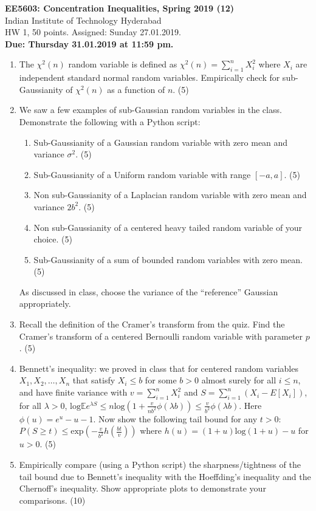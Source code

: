 \documentclass{article}
\begin{document}
\begin{center}
{\large{{\bf{EE5603: Concentration Inequalities, Spring 2019 (12)}\\}}}
Indian Institute of Technology Hyderabad\\
HW 1, 50 points. Assigned: Sunday 27.01.2019.\\
{\bf{Due: Thursday 31.01.2019 at 11:59 pm.}} 
\end{center}
\begin{enumerate}
\item{The $\chi^2(n)$ random variable is defined as $\chi^2(n) = \sum\limits_{i=1}^{n}X_i^2$ where $X_i$ are independent standard normal random variables. Empirically check for sub-Gaussianity of $\chi^2(n)$ as a function of $n$. (5)}
\item{We saw a few examples of sub-Gaussian random variables in the class. Demonstrate the following with a Python script:
\begin{enumerate}
\item{Sub-Gaussianity of a Gaussian random variable with zero mean and variance $\sigma^2$. (5)}
\item{Sub-Gaussianity of a Uniform random variable with range $[-a, a]$. (5)}
\item{Non sub-Gaussianity of a Laplacian random variable with zero mean and variance $2b^2$. (5)}
\item{Non sub-Gaussianity of a centered heavy tailed random variable of your choice. (5)}
\item{Sub-Gaussianity of a sum of bounded random variables with zero mean. (5)}
\end{enumerate}
As discussed in class, choose the variance of the ``reference'' Gaussian appropriately. 
}
\item{Recall the definition of the Cramer's transform from the quiz. Find the Cramer's transform of a centered Bernoulli random variable with parameter $p$. (5)}
\item{Bennett's inequality: we proved in class that for centered random variables $X_1, X_2, \ldots, X_n$ that satisfy $X_i \leq b$ for some $b > 0$ almost surely for all $i \leq n$, and have finite variance with $v = \sum\limits_{i=1}^nX_i^2$ and $S = \sum\limits_{i=1}^n (X_i - E[X_i])$, for all $\lambda > 0$, 
$\text{log} {\mathbb{E}}e^{\lambda S} \leq n\text{log} (1 + \frac{v}{nb^2} \phi(\lambda b)) \leq \frac{v}{b^2}\phi(\lambda b)$. Here $\phi(u) = e^u - u - 1$. Now show the following tail bound for any $t > 0$:
 $P(S \geq t) \leq \text{exp}(-\frac{v}{b^2}h(\frac{bt}{v}))$ where $h(u) = (1 + u)\text{log}(1 + u) - u$ for $u > 0$. 
   (5)} 
\item{Empirically compare (using a Python script) the sharpness/tightness of the tail bound due to Bennett's inequality with the Hoeffding's inequality and the Chernoff's inequality. Show appropriate plots to demonstrate your comparisons. (10)}
\end{enumerate}
\end{document}

